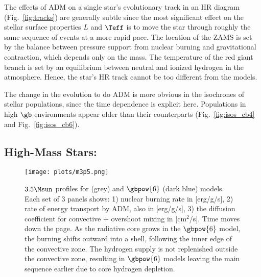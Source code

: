   The effects of ADM on a single star's evolutionary track in an HR diagram (Fig.~\ref{fig:tracks}) are generally subtle since the most significant effect on the stellar surface properties $L$ and $\Teff$ is to move the star through roughly the same sequence of events at a more rapid pace. The location of the ZAMS is set by the balance between pressure support from nuclear burning and gravitational contraction, which depends only on the mass. The temperature of the red giant branch is set by an equilibrium between neutral and ionized hydrogen in the atmosphere. Hence, the star's HR track cannot be too different from the \nodm models.

  The change in the evolution to do ADM is more obvious in the isochrones of stellar populations, since the time dependence is explicit here. Populations in high $\gb$ environments appear older than their \nodm counterparts (Fig.~\ref{fig:isos_cb4} and Fig.~\ref{fig:isos_cb6}).  

\subsection{High-Mass Stars: \mrangehigh}
\label{sub:highmass}

  \begin{figure}
    \centering
    \texttt{[image: plots/m3p5.png]}
    \caption{$3.5 \Msun$ profiles for \nodm (grey) and $\gbpow{6}$ (dark blue) models. Each set of 3 panels shows: 1) nuclear burning rate in [erg/g/s], 2) rate of energy transport by ADM, also in [erg/g/s], 3) the diffusion coefficient for convective + overshoot mixing in [cm$^2$/s]. Time moves down the page. As the radiative core grows in the $\gbpow{6}$ model, the burning shifts outward into a shell, following the inner edge of the convective zone. The hydrogen supply is not replenished outside the convective zone, resulting in $\gbpow{6}$ models leaving the main sequence earlier due to core hydrogen depletion.
    }
    \label{fig:m3p5}
  \end{figure}

